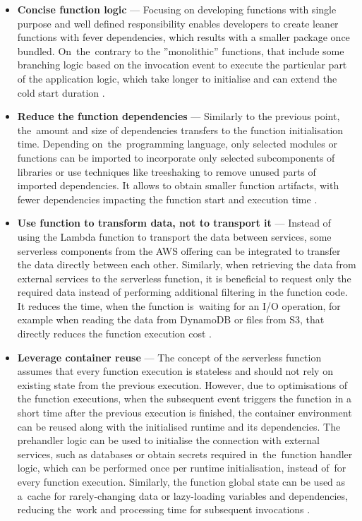 \begin{itemize}
   \item \textbf{Concise function logic} --- Focusing on developing functions with single purpose and well defined responsibility enables developers to create leaner functions with fever dependencies, which results with a smaller package once bundled.
   On~the~contrary to the ''monolithic'' functions, that include some branching logic based on the invocation event to execute the particular part of the application logic, which take longer to initialise and can extend the cold start duration \cite{BecomeAServerlessBlackBelt}.
   \item \textbf{Reduce the function dependencies} --- Similarly to the previous point, the~amount and size of dependencies transfers to the function initialisation time.
   Depending on~the~programming language, only selected modules or functions can be imported to incorporate only selected subcomponents of libraries or use techniques like treeshaking to remove unused parts of imported dependencies.
   It allows to obtain smaller function artifacts, with fewer dependencies impacting the function start and execution time \cite{OptimiseYourServerlessApplications}.
   \item \textbf{Use function to transform data, not to transport it} --- Instead of using the Lambda function to transport the data between services, some serverless components from the AWS offering can be integrated to transfer the data directly between each other.
   Similarly, when retrieving the data from external services to the serverless function, it is beneficial to request only the required data instead of performing additional filtering in the function code. It reduces the time, when the function is~waiting for an I/O operation, for example when reading the data from DynamoDB or files from S3, that directly reduces the function execution cost \cite{BecomeAServerlessBlackBelt}.
   \item \textbf{Leverage container reuse} --- The concept of the serverless function assumes that every function execution is stateless and should not rely on existing state from the previous execution.
   However, due to optimisations of the function executions, when the subsequent event triggers the function in a short time after the previous execution is finished, the container environment can be reused along with the initialised runtime and its dependencies.
   The prehandler logic can be used to initialise the connection with external services, such as databases or obtain secrets required in~the~function handler logic, which can be performed once per runtime initialisation, instead of~for every function execution.
   Similarly, the function global state can be used as a~cache for rarely-changing data or lazy-loading variables and dependencies, reducing the~work and processing time for subsequent invocations \cite{AWSLambdaPerformanceOptimization}.
\end{itemize}

